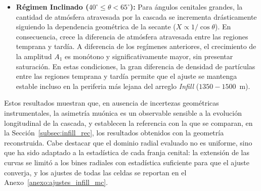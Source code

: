 \begin{itemize}
	\item \textbf{Régimen Inclinado ($40^\circ \leq \theta < 65^\circ$):} Para ángulos cenitales grandes, la cantidad de atmósfera atravesada por la cascada se incrementa drásticamente siguiendo la dependencia geométrica de la secante ($X \propto 1/\cos\theta$). %
En consecuencia, crece la diferencia de atmósfera atravesada entre las regiones temprana y tardía. A diferencia de los regímenes anteriores, el crecimiento de la amplitud $A_1$ es monótono y significativamente mayor, sin presentar saturación. En estas condiciones, la gran diferencia de densidad de partículas entre las regiones temprana y tardía permite que el ajuste se mantenga estable incluso en la periferia más lejana del arreglo \textit{Infill} ($1350 - 1500$~m).
\end{itemize}

Estos resultados muestran que, en ausencia de incertezas geométricas instrumentales, la asimetría muónica es un observable sensible a la evolución longitudinal de la cascada, y establecen la referencia con la que se comparan, en la Sección~\ref{subsec:infill_rec}, los resultados obtenidos con la geometría reconstruida. Cabe destacar que el dominio radial evaluado no es uniforme, sino que ha sido adaptado a la estadística de cada franja cenital: la extensión de las curvas se limitó a los bines radiales con estadística suficiente para que el ajuste converja, y los ajustes de todas las celdas se reportan en el Anexo~\ref{anexo:ajustes_infill_mc}.

